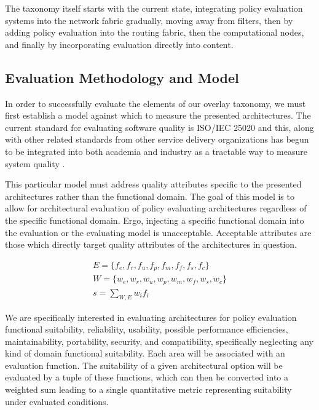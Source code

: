 The taxonomy itself starts with the current state, integrating policy evaluation systems into the network fabric gradually, moving away from filters, then by adding policy evaluation into the routing fabric, then the computational nodes, and finally by incorporating evaluation directly into content.

\subsection{Evaluation Methodology and Model}
In order to successfully evaluate the elements of our overlay taxonomy, we must first establish a model against which to measure the presented architectures.  The current standard for evaluating software quality is ISO/IEC 25020 and this, along with other related standards from other service delivery organizations has begun to be integrated into both academia and industry as a tractable way to measure system quality \cite{IT QUALITY PAPER, ISO STANDARD}.

This particular model must address quality attributes specific to the presented architectures rather than the functional domain.  The goal of this model is to allow for architectural evaluation of policy evaluating architectures regardless of the specific functional domain.  Ergo, injecting a specific functional domain into the evaluation or the evaluating model is unacceptable.  Acceptable attributes are those which directly target quality attributes of the architectures in question.

\begin{eqnarray}
E = \lbrace f_{e}, f_{r}, f_{u}, f_{p}, f_{m}, f_{f}, f_{s}, f_{c} \rbrace \\
W= \lbrace w_{e}, w_{r}, w_{u}, w_{p}, w_{m}, w_{f}, w_{s}, w_{c} \rbrace \\
s = \sum_{W, E} w_{i} f_{i}
\end{eqnarray}

We are specifically interested in evaluating architectures for policy evaluation functional suitability, reliability, usability, possible performance efficiencies, maintainability, portability, security, and compatibility, specifically neglecting any kind of domain functional suitability.  Each area will be associated with an evaluation function.  The suitability of a given architectural option will be evaluated by a tuple of these functions, which can then be converted into a weighted sum leading to a single quantitative metric representing suitability under evaluated conditions.

